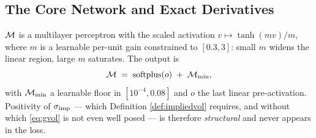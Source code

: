 %
%
%


\subsection{The Core Network and Exact Derivatives}
\label{subsec:network}

$\mathcal{M}$ is a multilayer perceptron with the scaled activation $v\mapsto\tanh(mv)/m$, where
$m$ is a learnable per-unit gain constrained to $[0.3,3]$: small $m$ widens the linear region, large
$m$ saturates. The output is
\begin{equation}\label{eq:coreoutput}
  \mathcal{M} \;=\; \operatorname{softplus}(o)\;+\;\mathcal{M}_{\min},
\end{equation}
with $\mathcal{M}_{\min}$ a learnable floor in $[10^{-4},0.08]$ and $o$ the last linear pre-activation.
Positivity of $\sigma_{\mathrm{imp}}$ --- which Definition \ref{def:impliedvol} requires, and without which
\eqref{eq:gvol} is not even well posed --- is therefore \emph{structural} and never appears in the
loss.


